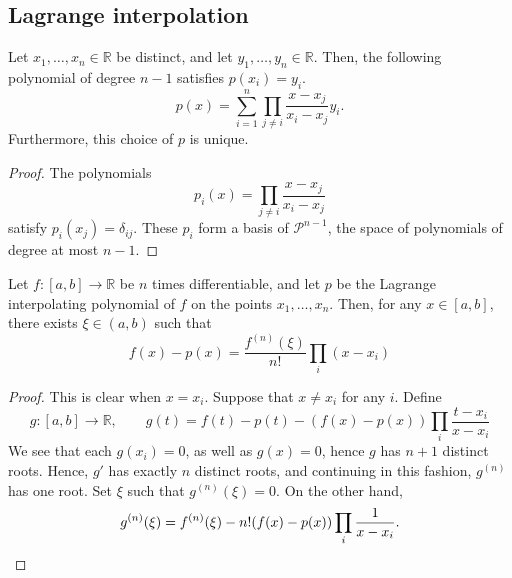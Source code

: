 \documentclass[11pt]{article}
\newcommand{\R}{\mathbb{R}}
\theoremstyle{definition}
\theoremstyle{remark}
\numberwithin{equation}{section}
\begin{document}
    \subsection{Lagrange interpolation}
    \begin{theorem}
        Let $x_1, \dots, x_n \in \R$ be distinct, and let $y_1, \dots, y_n \in \R$.
        Then, the following polynomial of degree $n - 1$ satisfies $p(x_i) = y_i$. \[
            p(x) = \sum_{i = 1}^{n} \prod_{j \neq i} \frac{x - x_j}{x_i - x_j} y_i.
        \] Furthermore, this choice of $p$ is unique.
    \end{theorem}
    \begin{proof}
        The polynomials \[
            p_i(x) = \prod_{j \neq i} \frac{x - x_j}{x_i - x_j}
        \] satisfy $p_i(x_j) = \delta_{ij}$. These $p_i$ form a basis of
        $\mathscr{P}^{n - 1}$, the space of polynomials of degree at most $n - 1$.
    \end{proof}

    \begin{theorem}
        Let $f\colon [a, b] \to \R$ be $n$ times differentiable, and let $p$ be the
        Lagrange interpolating polynomial of $f$ on the points $x_1, \dots, x_n$.
        Then, for any $x \in [a, b]$, there exists $\xi \in (a, b)$ such that \[
            f(x) - p(x) = \frac{f^{(n)}(\xi)}{n!} \prod_{i} (x - x_i)
        \] 
    \end{theorem}
    \begin{proof}
        This is clear when $x = x_i$. Suppose that $x \neq x_i$ for any $i$.  Define
        \[
            g\colon [a, b] \to \R, \qquad g(t) = f(t) - p(t) - (f(x) - p(x))
            \prod_{i} \frac{t - x_i}{x - x_i}
        \] We see that each $g(x_i) = 0$, as well as $g(x) = 0$, hence $g$ has $n +
        1$ distinct roots. Hence, $g'$ has exactly $n$ distinct roots, and continuing
        in this fashion, $g^{(n)}$ has one root. Set $\xi$ such that $g^{(n)}(\xi) =
        0$. On the other hand, \[
            g^{(n)}(\xi) = f^{(n)}(\xi) - n!(f(x) - p(x)) \prod_i \frac{1}{x
            - x_i}. \qedhere
        \] 
    \end{proof}
    
\end{document}
